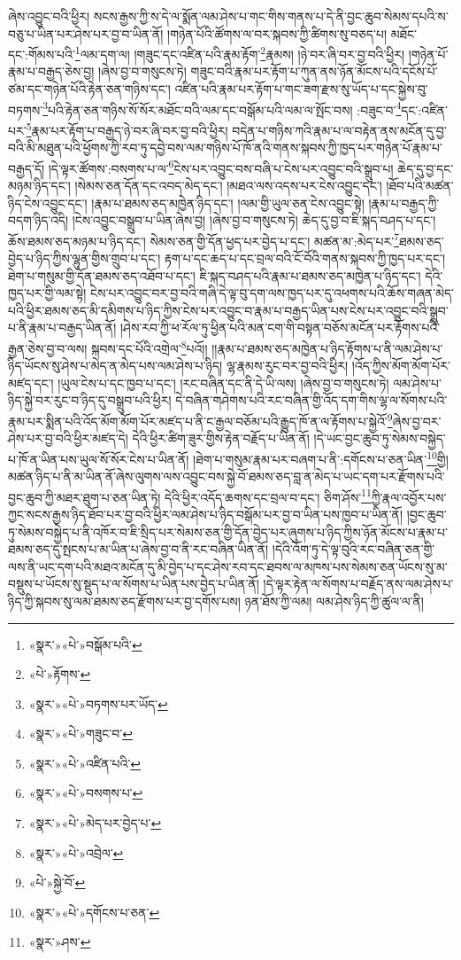 ཞེས་འབྱུང་བའི་ཕྱིར། སངས་རྒྱས་ཀྱི་ས་དེ་ལ་སྨོན་ལམ་ཤེས་པ་གང་གིས་གནས་པ་དེ་ནི་བྱང་ཆུབ་སེམས་དཔའི་ས་བཅུ་པ་ཡིན་པར་ཤེས་པར་བྱ་བ་ཡིན་ནོ། །གཉེན་པོའི་ཚོགས་ལ་བར་སྐབས་ཀྱི་ཚིགས་སུ་བཅད་པ། མཐོང་དང་:གོམས་པའི་\footnote{«སྣར་»«པེ་»བསྒོམ་པའི་}ལམ་དག་ལ། །གཟུང་དང་འཛིན་པའི་རྣམ་རྟོག་\footnote{«པེ་»རྟོགས་}རྣམས། །ཉེ་བར་ཞི་བར་བྱ་བའི་ཕྱིར། །གཉེན་པོ་རྣམ་པ་བརྒྱད་ཅེས་བྱ། །ཞེས་བྱ་བ་གསུངས་ཏེ། གཟུང་བའི་རྣམ་པར་རྟོག་པ་ཀུན་ནས་ཉོན་མོངས་པའི་དངོས་པོ་ཙམ་དང་གཉེན་པོའི་རྟེན་ཅན་གཉིས་དང་། འཛིན་པའི་རྣམ་པར་རྟོག་པ་གང་ཟག་རྫས་སུ་ཡོད་པ་དང་སྐྱེས་བུ་བཏགས་\footnote{«སྣར་»«པེ་»བཏགས་པར་ཡོད་}པའི་རྟེན་ཅན་གཉིས་སོ་སོར་མཐོང་བའི་ལམ་དང་བསྒོམ་པའི་ལམ་ལ་སྤོང་བས། :བཟུང་བ་\footnote{«སྣར་»«པེ་»གཟུང་བ་}དང་:འཛིན་པར་\footnote{«སྣར་»«པེ་»འཛིན་པའི་}རྣམ་པར་རྟོག་པ་བརྒྱད་ཉེ་བར་ཞི་བར་བྱ་བའི་ཕྱིར། བདེན་པ་གཉིས་ཀའི་རྣམ་པ་ལ་བརྟེན་ནས་མངོན་དུ་བྱ་བའི་མི་མཐུན་པའི་ཕྱོགས་ཀྱི་རབ་ཏུ་དབྱེ་བས་ལམ་གཉིས་པོ་ཁོ་ནའི་གནས་སྐབས་ཀྱི་ཁྱད་པར་གཉེན་པོ་རྣམ་པ་བརྒྱད་དོ། །དེ་ལྟར་ཚོགས་:བསགས་པ་ལ་\footnote{«སྣར་»«པེ་»བསགས་པ་}ངེས་པར་འབྱུང་བས་བཞི་པ་ངེས་པར་འབྱུང་བའི་སྒྲུབ་པ། ཆེད་དུ་བྱ་དང་མཉམ་ཉིད་དང་། །སེམས་ཅན་དོན་དང་འབད་མེད་དང་། །མཐའ་ལས་འདས་པར་ངེས་འབྱུང་དང་། །ཐོབ་པའི་མཚན་ཉིད་ངེས་འབྱུང་དང་། །རྣམ་པ་ཐམས་ཅད་མཁྱེན་ཉིད་དང་། །ལམ་གྱི་ཡུལ་ཅན་ངེས་འབྱུང་སྟེ། །རྣམ་པ་བརྒྱད་ཀྱི་བདག་ཉིད་འདི། །ངེས་འབྱུང་བསྒྲུབ་པ་ཡིན་ཞེས་བྱ། །ཞེས་བྱ་བ་གསུངས་ཏེ། ཆེད་དུ་བྱ་བ་ཇི་སྐད་བཤད་པ་དང་། ཆོས་ཐམས་ཅད་མཉམ་པ་ཉིད་དང་། སེམས་ཅན་གྱི་དོན་ཕྱད་པར་བྱེད་པ་དང་། མཚན་མ་:མེད་པར་\footnote{«སྣར་»«པེ་»མེད་པར་བྱེད་པ་}ཐམས་ཅད་བྱེད་པ་ཉིད་ཀྱིས་ལྷུན་གྱིས་གྲུབ་པ་དང་། རྟག་པ་དང་ཆད་པ་དང་བྲལ་བའི་ངོ་བོའི་གནས་སྐབས་ཀྱི་ཁྱད་པར་དང་། ཐེག་པ་གསུམ་གྱི་དོན་ཐམས་ཅད་འཐོབ་པ་དང་། ཇི་སྐད་བཤད་པའི་རྣམ་པ་ཐམས་ཅད་མཁྱེན་པ་ཉིད་དང་། དེའི་ཁྱད་པར་གྱི་ལམ་སྟེ། ངེས་པར་འབྱུང་བར་བྱ་བའི་གཞི་དེ་ལྟ་བུ་དག་ལས་ཁྱད་པར་དུ་འཕགས་པའི་ཆོས་གཞན་མེད་པའི་ཕྱིར་ཐམས་ཅད་མི་དམིགས་པ་ཉིད་ཀྱིས་ངེས་པར་འབྱུང་བ་རྣམ་པ་བརྒྱད་ཡིན་པས་ངེས་པར་འབྱུང་བའི་སྒྲུབ་པ་ནི་རྣམ་པ་བརྒྱད་ཡིན་ནོ། །ཤེས་རབ་ཀྱི་ཕ་རོལ་ཏུ་ཕྱིན་པའི་མན་ངག་གི་བསྟན་བཅོས་མངོན་པར་རྟོགས་པའི་རྒྱན་ཅེས་བྱ་བ་ལས། སྐབས་དང་པོའི་འགྲེལ་\footnote{«སྣར་»«པེ་»འབྲེལ་}པའོ།། །།རྣམ་པ་ཐམས་ཅད་མཁྱེན་པ་ཉིད་རྟོགས་པ་ནི་ལམ་ཤེས་པ་ཉིད་ཡོངས་སུ་ཤེས་པ་མེད་ན་མེད་པས་ལམ་ཤེས་པ་ཉིད། ལྷ་རྣམས་རུང་བར་བྱ་བའི་ཕྱིར། །འོད་ཀྱིས་མོག་མོག་པོར་མཛད་དང་། །ཡུལ་ངེས་པ་དང་ཁྱབ་པ་དང་། །རང་བཞིན་དང་ནི་དེ་ཡི་ལས། །ཞེས་བྱ་བ་གསུངས་ཏེ། ལམ་ཤེས་པ་ཉིད་སྐྱེ་བར་རུང་བ་ཉིད་དུ་བསྒྲུབ་པའི་ཕྱིར། དེ་བཞིན་གཤེགས་པའི་རང་བཞིན་གྱི་འོད་དག་གིས་ལྷ་ལ་སོགས་པའི་རྣམ་པར་སྨིན་པའི་འོད་མོག་མོག་པོར་མཛད་པ་ནི་ང་རྒྱལ་བཅོམ་པའི་རྒྱུད་ཁོ་ན་ལ་རྟོགས་པ་སྐྱེའོ་\footnote{«པེ་»སྐྱེ་བོ་}ཞེས་བྱ་བར་ཤེས་པར་བྱ་བའི་ཕྱིར་མཛད་དེ། དེའི་ཕྱིར་ཚིག་ཟུར་གྱིས་རྟེན་བརྗོད་པ་ཡིན་ནོ། །དེ་ཡང་བྱང་ཆུབ་ཏུ་སེམས་བསྐྱེད་པ་ཁོ་ན་ཡིན་པས་ཡུལ་སོ་སོར་ངེས་པ་ཡིན་ནོ། །ཐེག་པ་གསུམ་རྣམ་པར་བཞག་པ་ནི་:དགོངས་པ་ཅན་ཡིན་\footnote{«སྣར་»«པེ་»དགོངས་པ་ཅན་}གྱི། མཚན་ཉིད་པ་ནི་མ་ཡིན་ནོ་ཞེས་ལུགས་ལས་འབྱུང་བས་སྐྱེ་བོ་ཐམས་ཅད་བླ་ན་མེད་པ་ཡང་དག་པར་རྫོགས་པའི་བྱང་ཆུབ་ཀྱི་མཐར་ཐུག་པ་ཅན་ཡིན་ཏེ། དེའི་ཕྱིར་འདོད་ཆགས་དང་བྲལ་བ་དང་། ཅིག་ཤོས་\footnote{«སྣར་»ཤས་}ཀྱི་རྣལ་འབྱོར་པས་ཀྱང་སངས་རྒྱས་ཉིད་ཐོབ་པར་བྱ་བའི་ཕྱིར་ལམ་ཤེས་པ་ཉིད་བསྒོམ་པར་བྱ་བ་ཡིན་པས་ཁྱབ་པ་ཡིན་ནོ། །བྱང་ཆུབ་ཏུ་སེམས་བསྐྱེད་པ་ནི་འཁོར་བ་ཇི་སྲིད་པར་སེམས་ཅན་གྱི་དོན་བྱེད་པར་ཞུགས་པ་ཉིད་ཀྱིས་ཉོན་མོངས་པ་རྣམ་པ་ཐམས་ཅད་དུ་སྤངས་པ་མ་ཡིན་པ་ཞེས་བྱ་བ་ནི་རང་བཞིན་ཡིན་ནོ། །དེའི་འོག་ཏུ་དེ་ལྟ་བུའི་རང་བཞིན་ཅན་གྱི་ལས་ནི་ཡང་དག་པའི་མཐའ་མངོན་དུ་མི་བྱེད་པ་དང་ཤེས་རབ་དང་ཐབས་ལ་མཁས་པས་སེམས་ཅན་ཡོངས་སུ་མ་བསྡུས་པ་ཡོངས་སུ་སྡུད་པ་ལ་སོགས་པ་ཡིན་པས་བྱེད་པ་ཡིན་ནོ། །དེ་ལྟར་རྟེན་ལ་སོགས་པ་བརྗོད་ནས་ལམ་ཤེས་པ་ཉིད་ཀྱི་སྐབས་སུ་ལམ་ཐམས་ཅད་རྫོགས་པར་བྱ་དགོས་པས། ཉན་ཐོས་ཀྱི་ལམ། ལམ་ཤེས་ཉིད་ཀྱི་ཚུལ་ལ་ནི། 